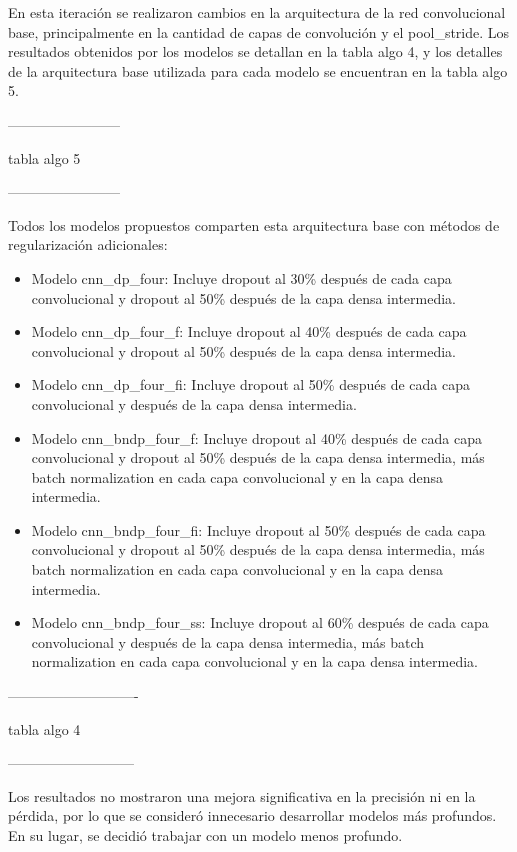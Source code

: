 En esta iteración se realizaron cambios en la arquitectura de la red convolucional base, principalmente en la cantidad de capas de convolución y el pool\_stride. Los resultados obtenidos por los modelos se detallan en la tabla algo 4, y los detalles de la arquitectura base utilizada para cada modelo se encuentran en la tabla algo 5.

------------------------

tabla algo 5

------------------------

Todos los modelos propuestos comparten esta arquitectura base con métodos de regularización adicionales:

\begin{itemize}

\item Modelo cnn\_dp\_four: Incluye dropout al 30\% después de cada capa convolucional y dropout al 50\% después de la capa densa intermedia.

\item Modelo cnn\_dp\_four\_f: Incluye dropout al 40\% después de cada capa convolucional y dropout al 50\% después de la capa densa intermedia.

\item Modelo cnn\_dp\_four\_fi: Incluye dropout al 50\% después de cada capa convolucional y después de la capa densa intermedia.

\item Modelo cnn\_bndp\_four\_f: Incluye dropout al 40\% después de cada capa convolucional y dropout al 50\% después de la capa densa intermedia, más batch normalization en cada capa convolucional y en la capa densa intermedia.

\item Modelo cnn\_bndp\_four\_fi: Incluye dropout al 50\% después de cada capa convolucional y dropout al 50\% después de la capa densa intermedia, más batch normalization en cada capa convolucional y en la capa densa intermedia.

\item Modelo cnn\_bndp\_four\_ss: Incluye dropout al 60\% después de cada capa convolucional y después de la capa densa intermedia, más batch normalization en cada capa convolucional y en la capa densa intermedia.

\end{itemize}
----------------------------

tabla algo 4

---------------------------

Los resultados no mostraron una mejora significativa en la precisión ni en la pérdida, por lo que se consideró innecesario desarrollar modelos más profundos. En su lugar, se decidió trabajar con un modelo menos profundo.